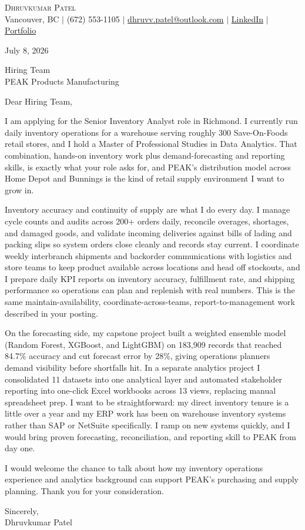 \documentclass[letterpaper,11pt]{article}
\begin{document}
\begin{center}
    {\Large \scshape Dhruvkumar Patel}\\[2pt]
    \small Vancouver, BC $|$ (672) 553-1105 $|$ \href{mailto:dhruvv.patel@outlook.com}{dhruvv.patel@outlook.com} $|$
    \href{https://www.linkedin.com/in/dhruvkumarpatell/}{LinkedIn} $|$ \href{https://dhruvvkumarpatel.vercel.app/}{Portfolio}
\end{center}

\vspace{8pt}
July 8, 2026

\vspace{4pt}
Hiring Team\\
PEAK Products Manufacturing

\vspace{8pt}
Dear Hiring Team,

I am applying for the Senior Inventory Analyst role in Richmond. I currently run daily inventory operations for a warehouse serving roughly 300 Save-On-Foods retail stores, and I hold a Master of Professional Studies in Data Analytics. That combination, hands-on inventory work plus demand-forecasting and reporting skills, is exactly what your role asks for, and PEAK's distribution model across Home Depot and Bunnings is the kind of retail supply environment I want to grow in.

Inventory accuracy and continuity of supply are what I do every day. I manage cycle counts and audits across 200+ orders daily, reconcile overages, shortages, and damaged goods, and validate incoming deliveries against bills of lading and packing slips so system orders close cleanly and records stay current. I coordinate weekly interbranch shipments and backorder communications with logistics and store teams to keep product available across locations and head off stockouts, and I prepare daily KPI reports on inventory accuracy, fulfillment rate, and shipping performance so operations can plan and replenish with real numbers. This is the same maintain-availability, coordinate-across-teams, report-to-management work described in your posting.

On the forecasting side, my capstone project built a weighted ensemble model (Random Forest, XGBoost, and LightGBM) on 183,909 records that reached 84.7\% accuracy and cut forecast error by 28\%, giving operations planners demand visibility before shortfalls hit. In a separate analytics project I consolidated 11 datasets into one analytical layer and automated stakeholder reporting into one-click Excel workbooks across 13 views, replacing manual spreadsheet prep. I want to be straightforward: my direct inventory tenure is a little over a year and my ERP work has been on warehouse inventory systems rather than SAP or NetSuite specifically. I ramp on new systems quickly, and I would bring proven forecasting, reconciliation, and reporting skill to PEAK from day one.

I would welcome the chance to talk about how my inventory operations experience and analytics background can support PEAK's purchasing and supply planning. Thank you for your consideration.

\vspace{8pt}
Sincerely,\\
Dhruvkumar Patel
\end{document}
